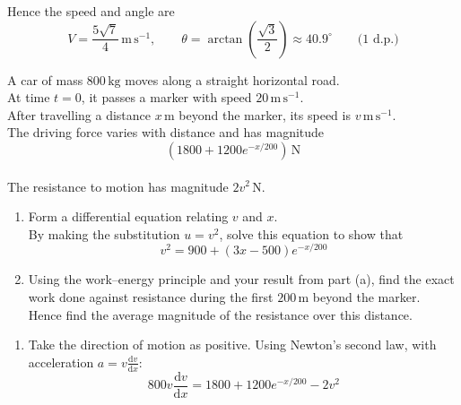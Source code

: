 \documentclass[leqno]{article}
\begin{document}
\begin{enumerate}[
  label=\textbf{\arabic*.},
  leftmargin=*,
  topsep=0pt,
  partopsep=0pt,
  parsep=0pt
]
\begin{djsSolution}
\begin{enumerate}[label=\textbf{(\alph*)}, start=1]
Hence the speed and angle are
\[
V=\dfrac{5\sqrt7}{4}\,\mathrm{m\,s^{-1}},
\qquad \theta=\arctan\left(\dfrac{\sqrt3}{2}\right)\approx40.9^\circ\qquad\text{(1 d.p.)}
\]

\end{enumerate}
\end{djsSolution}

\newpage

\questionitem

A car of mass $800\,\mathrm{kg}$ moves along a straight horizontal road. \\
At time $t=0$, it passes a marker with speed $20\,\mathrm{m\,s^{-1}}$. \\
After travelling a distance $x\,\mathrm{m}$ beyond the marker, its speed is $v\,\mathrm{m\,s^{-1}}$. \\

The driving force varies with distance and has magnitude
\[
\left(1800+1200e^{-x/200}\right)\,\mathrm{N}
\] \\
The resistance to motion has magnitude $2v^2\,\mathrm{N}$. \\

\begin{enumerate}[label=\textbf{(\alph*)}]
  \item Form a differential equation relating $v$ and $x$. \\
  By making the substitution $u=v^2$, solve this equation to show that
  \[
  v^2=900+(3x-500)e^{-x/200}
  \] 
  \item Using the work--energy principle and your result from part (a), find the exact work done against resistance during the first $200\,\mathrm{m}$ beyond the marker. \\
  Hence find the average magnitude of the resistance over this distance.  \\
\end{enumerate}

\vspace*{10pt}

\begin{djsSolution}
\begin{enumerate}[label=\textbf{(\alph*)}, start=1]
  \item Take the direction of motion as positive. Using Newton's second law, with acceleration \(a=v\frac{\mathrm{d}v}{\mathrm{d}x}\):
  \[
  800v\dfrac{\mathrm{d}v}{\mathrm{d}x}=1800+1200e^{-x/200}-2v^2
  \]


\end{enumerate}
\end{djsSolution}
\end{enumerate}
\end{document}
